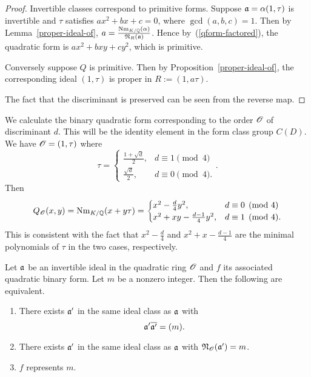 \begin{proof}
 Invertible classes correspond to primitive forms. Suppose $\mathfrak{a}=\alpha(1,\tau)$ is invertible and $\tau$ satisfies $ax^2+bx+c=0$, where $\gcd(a,b,c)=1$. Then by Lemma~\ref{proper-ideal-of}, $a=\frac{\operatorname{Nm}_{K/\mathbb{Q}}(\alpha)}{\mathfrak N_R(\mathfrak{a})}$. Hence by~(\ref{qform-factored}), the quadratic form is $ax^2+bxy+cy^2$, which is primitive.

Conversely suppose $Q$ is primitive. Then by Proposition~\ref{proper-ideal-of}, the corresponding ideal $(1,\tau)$ is proper in $R:=(1,a\tau)$. %

The fact that the discriminant is preserved can be seen from the reverse map.
\end{proof}
\begin{ex}
We calculate the binary quadratic form corresponding to the order $\mathscr{O}$ of discriminant $d$. This will be the identity element in the form class group $C(D)$. %
We have $\mathscr{O}=(1,\tau)$ where
\[
\tau=\begin{cases}
\frac{1+\sqrt{d}}{2},&d\equiv 1\pmod{4}\\
\frac{\sqrt{d}}2,&d\equiv 0\pmod{4}.
\end{cases}.
\]
Then
\[
Q_{\mathscr{O}}(x,y)=\operatorname{Nm}_{K/\mathbb{Q}}(x+y\tau)=\begin{cases}
x^2-\frac{d}{4}y^2,&d\equiv 0\pmod 4\\
x^2+xy-\frac{d-1}{4}y^2,&d\equiv 1\pmod 4.
\end{cases}
\]
This is consistent with the fact that $x^2-\frac{d}{4}$ and $x^2+x-\frac{d-1}{4}$ are the minimal polynomials of $\tau$ in the two cases, respectively.
\end{ex}
\begin{thm}
Let $\mathfrak{a}$ be an invertible ideal in the quadratic ring $\mathscr{O}$ and $f$ its associated quadratic binary form. Let $m$ be a nonzero integer. Then the following are equivalent.
\begin{enumerate}
\item
There exists $\mathfrak{a}'$ in the same ideal class as $\mathfrak{a}$ with
\[
\mathfrak{a}'\overline{\mathfrak{a}'}=(m).
\]
\item
There exists $\mathfrak{a}'$ in the same ideal class as $\mathfrak{a}$ with $\mathfrak N_{\mathscr{O}}(\mathfrak{a}')=m$.
\item 
$f$ represents $m$.
\end{enumerate}
\end{thm}
